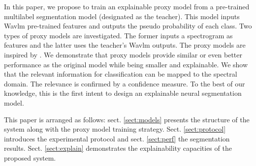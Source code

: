 In this paper, we propose to train an explainable proxy model from a pre-trained multilabel segmentation model (designated as the teacher).
This model inputs Wavlm pre-trained features and outputs the pseudo probability of each class.
Two types of proxy models are investigated.
The former inputs a spectrogram as features and the latter uses the teacher's Wavlm outputs.
The proxy models are inspired by \cite{parekh2023tackling}.
We demonstrate that proxy models provide similar or even better performance as the original model while being smaller and explainable.
We show that the relevant information for classification can be mapped to the spectral domain.
The relevance is confirmed by a confidence measure.
To the best of our knowledge, this is the first intent to design an explainable neural segmentation model.  

This paper is arranged as follows: sect. \ref{sect:models} presents the structure of the system along with the proxy model training strategy.
Sect. \ref{sect:protocol} introduces the experimental protocol and sect. \ref{sect:perf} the segmentation results. 
Sect. \ref{sect:explain} demonstrates the explainability capacities of the proposed system.









